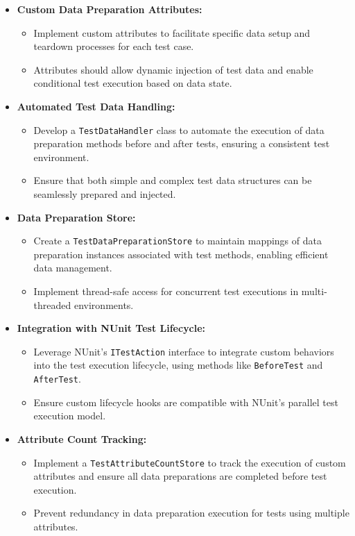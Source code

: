 \begin{itemize}
    \item \textbf{Custom Data Preparation Attributes:}
    {\sloppy
    \begin{itemize}
        \item Implement custom attributes to facilitate specific data setup and teardown processes for each test case.
        \item Attributes should allow dynamic injection of test data and enable conditional test execution based on data state.
    \end{itemize}
    }
    \item \textbf{Automated Test Data Handling:}
    \begin{itemize}
        \item Develop a \texttt{TestDataHandler} class to automate the execution of data preparation methods before and after tests, ensuring a consistent test environment.
        \item Ensure that both simple and complex test data structures can be seamlessly prepared and injected.
    \end{itemize}
    
    \item \textbf{Data Preparation Store:}
    \begin{itemize}
        \item Create a \texttt{TestDataPreparationStore} to maintain mappings of data preparation instances associated with test methods, enabling efficient data management.
        \item Implement thread-safe access for concurrent test executions in multi-threaded environments.
    \end{itemize}
    
    \item \textbf{Integration with NUnit Test Lifecycle:}
    \begin{itemize}
        \item Leverage NUnit's \texttt{ITestAction} interface to integrate custom behaviors into the test execution lifecycle, using methods like \texttt{BeforeTest} and \texttt{AfterTest}.
        \item Ensure custom lifecycle hooks are compatible with NUnit's parallel test execution model.
    \end{itemize}
    
    \item \textbf{Attribute Count Tracking:}
    \begin{itemize}
        \item Implement a \texttt{TestAttributeCountStore} to track the execution of custom attributes and ensure all data preparations are completed before test execution.
        \item Prevent redundancy in data preparation execution for tests using multiple attributes.
    \end{itemize}
    

\end{itemize}
